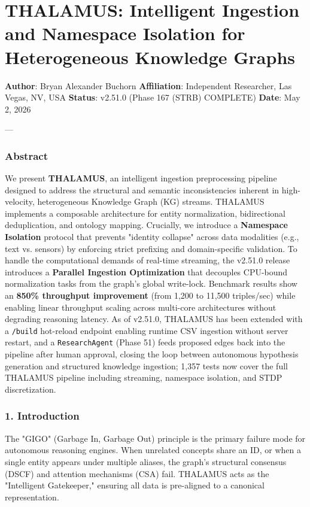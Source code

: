 \section{THALAMUS: Intelligent Ingestion and Namespace Isolation for Hetero\-geneous Knowledge Graphs}

\textbf{Author}: Bryan Alexander Buchorn  
\textbf{Affiliation}: Independent Researcher, Las Vegas, NV, USA  
\textbf{Status}: v2.51.0 (Phase 167 (STRB) COMPLETE)
\textbf{Date}: May 2, 2026

---

\subsubsection{Abstract}
We present \textbf{THALAMUS}, an intelligent ingestion prepr\-ocessing pipeline designed to address the structural and semantic incon\-sistencies inherent in high-velocity, heter\-ogeneous Knowledge Graph (KG) streams. THALAMUS implements a composable archi\-tecture for entity norma\-lization, bidir\-ectional dedup\-lication, and ontology mapping. Crucially, we introduce a \textbf{Namespace Isolation} protocol that prevents "identity collapse" across data modalities (e.g., text vs. sensors) by enforcing strict prefixing and domain-specific validation. To handle the compu\-tational demands of real-time streaming, the v2.51.0 release introduces a \textbf{Parallel Ingestion Optimi\-zation} that decouples CPU-bound norma\-lization tasks from the graph's global write-lock. Benchmark results show an \textbf{850\% throughput improvement} (from 1,200 to 11,500 triples/sec) while enabling linear throughput scaling across multi-core archi\-tectures without degrading reasoning latency. As of v2.51.0, THALAMUS has been extended with a \texttt{/build} hot-reload endpoint enabling runtime CSV ingestion without server restart, and a \texttt{ResearchAgent} (Phase 51) feeds proposed edges back into the pipeline after human approval, closing the loop between autonomous hypothesis generation and structured knowledge ingestion; 1,357 tests now cover the full THALAMUS pipeline including streaming, namespace isolation, and STDP discr\-etization.

\subsubsection{1. Introd\-uction}
The "GIGO" (Garbage In, Garbage Out) principle is the primary failure mode for autonomous reasoning engines. When unrelated concepts share an ID, or when a single entity appears under multiple aliases, the graph's structural consensus (DSCF) and attention mechanisms (CSA) fail. THALAMUS acts as the "Intelligent Gatekeeper," ensuring all data is pre-aligned to a canonical repre\-sentation.

